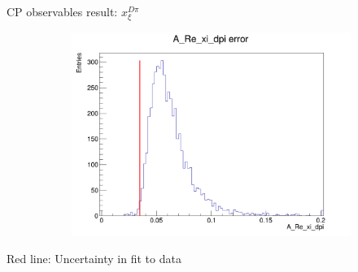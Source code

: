 \documentclass{beamer}
\begin{document}
\begin{frame}{CP observables result: $x_\xi^{D\pi}$}
\begin{figure}
\begin{subfigure}{0.42\textwidth}
      \includegraphics[width = 1.0\textwidth]{Plots/A_Re_xi_dpi_error_WithDataUncertainty.png}
    \end{subfigure}
  \end{figure}
  \begin{center}
    Red line: Uncertainty in fit to data
  \end{center}
\end{frame}
\end{document}
